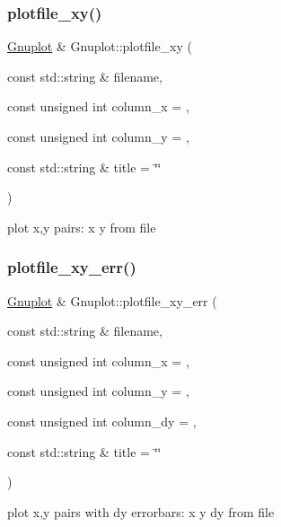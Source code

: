 \subsubsection{\texorpdfstring{plotfile\+\_\+xy()}{plotfile\_xy()}}
{\footnotesize\ttfamily \hyperlink{classGnuplot}{Gnuplot} \& Gnuplot\+::plotfile\+\_\+xy (\begin{DoxyParamCaption}\item[{const std\+::string \&}]{filename,  }\item[{const unsigned int}]{column\+\_\+x = {},  }\item[{const unsigned int}]{column\+\_\+y = {},  }\item[{const std\+::string \&}]{title = {\ttfamily \char`\"{}\char`\"{}} }\end{DoxyParamCaption})}

plot x,y pairs\+: x y from file \mbox{\label{classGnuplot_afe9d44ba12f617188111ab915010f3ab}} 
\subsubsection{\texorpdfstring{plotfile\+\_\+xy\+\_\+err()}{plotfile\_xy\_err()}}
{\footnotesize\ttfamily \hyperlink{classGnuplot}{Gnuplot} \& Gnuplot\+::plotfile\+\_\+xy\+\_\+err (\begin{DoxyParamCaption}\item[{const std\+::string \&}]{filename,  }\item[{const unsigned int}]{column\+\_\+x = {},  }\item[{const unsigned int}]{column\+\_\+y = {},  }\item[{const unsigned int}]{column\+\_\+dy = {},  }\item[{const std\+::string \&}]{title = {\ttfamily \char`\"{}\char`\"{}} }\end{DoxyParamCaption})}

plot x,y pairs with dy errorbars\+: x y dy from file \mbox{\label{classGnuplot_a9dbde2a91eb816481657f3a22c9b0046}} 
